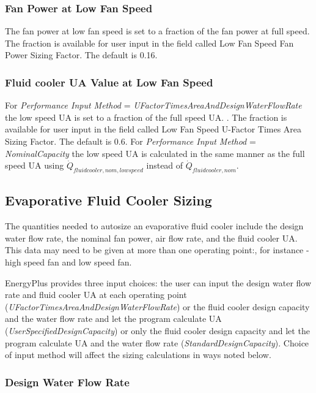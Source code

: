 \subsubsection{Fan Power at Low Fan Speed}\label{fan-power-at-low-fan-speed-1}

The fan power at low fan speed is set to a fraction of the fan power at full speed. The fraction is available for user input in the field called Low Fan Speed Fan Power Sizing Factor. The default is 0.16.

\subsubsection{Fluid cooler UA Value at Low Fan Speed}\label{fluid-cooler-ua-value-at-low-fan-speed}

For \emph{Performance Input Method} = \emph{UFactorTimesAreaAndDesignWaterFlowRate} the low speed UA is set to a fraction of the full speed UA. . The fraction is available for user input in the field called Low Fan Speed U-Factor Times Area Sizing Factor. The default is 0.6. For \emph{Performance Input Method} = \emph{NominalCapacity} the low speed UA is calculated in the same manner as the full speed UA using \({\dot Q_{fluidcooler,nom,lowspeed}}\) instead of \({\dot Q_{fluidcooler,nom}}\).

\subsection{Evaporative Fluid Cooler Sizing}\label{evaporative-fluid-cooler-sizing}

The quantities needed to autosize an evaporative fluid cooler include the design water flow rate, the nominal fan power, air flow rate, and the fluid cooler UA. This data may need to be given at more than one operating point:, for instance - high speed fan and low speed fan.

EnergyPlus provides three input choices: the user can input the design water flow rate and fluid cooler UA at each operating point (\emph{UFactorTimesAreaAndDesignWaterFlowRate}) or the fluid cooler design capacity and the water flow rate and let the program calculate UA (\emph{UserSpecifiedDesignCapacity}) or only the fluid cooler design capacity and let the program calculate UA and the water flow rate (\emph{StandardDesignCapacity}). Choice of input method will affect the sizing calculations in ways noted below.

\subsubsection{Design Water Flow Rate}\label{design-water-flow-rate-2}

